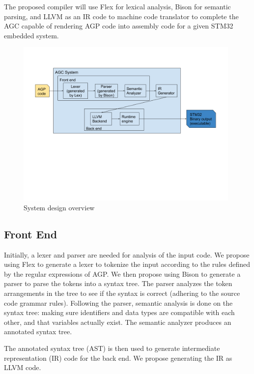 \documentclass[11pt]{article}
\begin{document}
The proposed compiler will use Flex for lexical analysis, Bison for semantic parsing, and  LLVM as an IR code to machine code translator to complete the AGC capable of rendering AGP code into assembly code for a given STM32 embedded system. 



\begin{figure}[hbt]
   \begin{center}
     \includegraphics[width=110mm]{figure1.png}
   \end{center}
  \caption{System design overview}
  \label{fig-sysdesov}
  \end{figure}



\subsection{Front End}

Initially, a lexer and parser are needed for analysis of the input code. We propose using Flex to generate a lexer to tokenize the input according to the rules defined by the regular expressions of AGP. We then propose using Bison to generate a parser to parse the tokens into a syntax tree. The parser analyzes the token arrangements in the tree to see if the syntax is correct (adhering to the source code grammar rules). Following the parser, semantic analysis is done  on the syntax tree: making sure identifiers and data types are compatible with each other, and that variables actually exist. The semantic analyzer produces an annotated syntax tree.

The annotated syntax tree (AST) is then used to generate intermediate representation (IR) code for the back end. We propose generating the IR as LLVM code.
\end{document}
